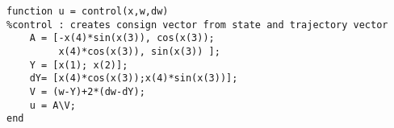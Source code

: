 {\small
\begin{lstlisting}[caption=Control Code, label=controlcode, frame=single]
function u = control(x,w,dw)
%control : creates consign vector from state and trajectory vector
    A = [-x(4)*sin(x(3)), cos(x(3));
         x(4)*cos(x(3)), sin(x(3)) ];
    Y = [x(1); x(2)];
    dY= [x(4)*cos(x(3));x(4)*sin(x(3))];
    V = (w-Y)+2*(dw-dY);
    u = A\V;
end
\end{lstlisting}
}
